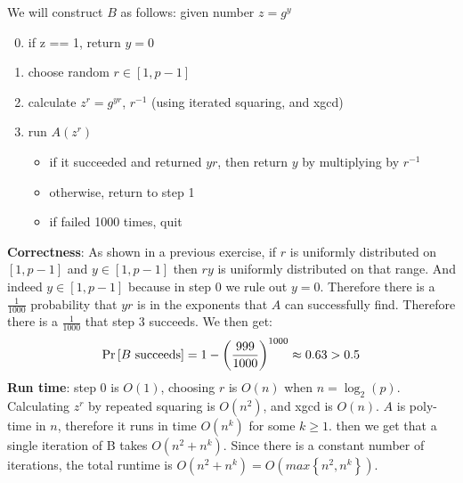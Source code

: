 \documentclass{article}
\begin{document}
We will construct $B$ as follows: given number $z=g^{y}$
\begin{enumerate}
\setcounter{enumi}{-1}
\item if z == 1, return $y=0$
\item choose random $r\in\left[1,p-1\right]$
\item calculate $z^{r}=g^{yr}$, $r^{-1}$ (using iterated squaring, and xgcd)
\item run $A\left(z^{r}\right)$
\begin{itemize}
\item if it succeeded and returned $yr$, then return $y$ by multiplying by $r^{-1}$
\item otherwise, return to step 1
\item if failed 1000 times, quit
\end{itemize}
\end{enumerate}
\textbf{Correctness}: As shown in a previous exercise, if $r$ is
uniformly distributed on $\left[1,p-1\right]$ and $y\in\left[1,p-1\right]$
then $ry$ is uniformly distributed on that range. And indeed $y\in\left[1,p-1\right]$
because in step 0 we rule out $y=0$. Therefore there is a $\frac{1}{1000}$
probability that $yr$ is in the exponents that $A$ can successfully
find. Therefore there is a $\frac{1}{1000}$ that step $3$ succeeds.
We then get:
\[
\Pr\left[\mbox{\ensuremath{B} succeeds}\right]=1-\left(\frac{999}{1000}\right)^{1000}\approx0.63>0.5
\]
\textbf{Run time}: step 0 is $O(1)$, choosing $r$ is $O(n)$ when
$n=\log_{2}\left(p\right)$. Calculating $z^{r}$ by repeated squaring
is $O(n^{2})$, and xgcd is $O(n)$. $A$ is poly-time in $n$, therefore it runs in time
$O(n^{k})$ for some $k\ge1$. then we get that a single iteration
of B takes $O(n^{2}+n^{k})$. Since there is a constant number of
iterations, the total runtime is $O(n^{2}+n^{k})=O\left(max\left\{ n^{2},n^{k}\right\} \right)$.

\section{} %
\end{document}
